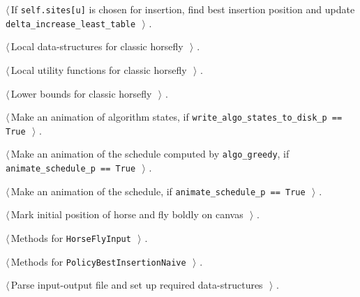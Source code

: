 \documentclass[11.5pt]{report}
\begin{document}
{\begin{list}{}{\setlength{\itemsep}{-\parsep}\setlength{\itemindent}{-\leftmargin}}
\item $\langle\,$If \texttt{self.sites[u]} is chosen for insertion, find best insertion position and update \texttt{delta\_increase\_least\_table}\nobreak\ {\footnotesize {}}$\,\rangle$ {\footnotesize {\NWtxtRefIn} .}
\item $\langle\,$Local data-structures for classic horsefly\nobreak\ {\footnotesize {}}$\,\rangle$ {\footnotesize {\NWtxtRefIn} .}
\item $\langle\,$Local utility functions for classic horsefly\nobreak\ {\footnotesize {}}$\,\rangle$ {\footnotesize {\NWtxtRefIn} .}
\item $\langle\,$Lower bounds for classic horsefly\nobreak\ {\footnotesize {}}$\,\rangle$ {\footnotesize {\NWtxtRefIn} .}
\item $\langle\,$Make an animation of algorithm states, if \verb|write_algo_states_to_disk_p == True|\nobreak\ {\footnotesize {}}$\,\rangle$ {\footnotesize {\NWtxtRefIn} .}
\item $\langle\,$Make an animation of the schedule computed by \verb|algo_greedy|, if \verb|animate_schedule_p == True|\nobreak\ {\footnotesize {}}$\,\rangle$ {\footnotesize {\NWtxtRefIn} .}
\item $\langle\,$Make an animation of the schedule, if \verb|animate_schedule_p == True|\nobreak\ {\footnotesize {}}$\,\rangle$ {\footnotesize {\NWtxtRefIn} .}
\item $\langle\,$Mark initial position of horse and fly boldly on canvas\nobreak\ {\footnotesize {}}$\,\rangle$ {\footnotesize {\NWtxtRefIn} .}
\item $\langle\,$Methods for \verb|HorseFlyInput|\nobreak\ {\footnotesize {}}$\,\rangle$ {\footnotesize {\NWtxtRefIn} .}
\item $\langle\,$Methods for \verb|PolicyBestInsertionNaive|\nobreak\ {\footnotesize {}}$\,\rangle$ {\footnotesize {\NWtxtRefIn} .}
\item $\langle\,$Parse input-output file and set up required data-structures\nobreak\ {\footnotesize {}}$\,\rangle$ {\footnotesize {\NWtxtRefIn} .}

\end{list}}
\end{document}
